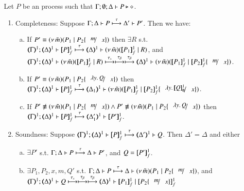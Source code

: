 \documentclass[runningheads]{llncs}
\begin{document}
{\begin{proposition}%
	\label{prop:op_corr_HOp_to_HO}
	Let $P$ be an \HOp process such that $\Gamma; \emptyset; \Delta \vdash P \triangleright \diamond$.
	\begin{enumerate}[1.]
		\item Completeness: 
			Suppose $\Gamma; \Delta \vdash P \stackrel{\tau}{\longmapsto} \Delta' \vdash P'$. Then we have:
%
			\begin{enumerate}[a)]
				\item
					If  $P' \scong \newsp{\tilde{m}}{P_1 \Par P_2\subst{m}{x}}$
					then $\exists R$ s.t. \\
					$\horel{\tmap{\Gamma}{1}}{\tmap{\Delta}{1}}{\pmapp{P}{1}{f}}{\hby{\tau}}{\mapt{\Delta}^{1}}{\newsp{\tilde{m}}{\pmapp{P_1}{1}{f} \Par R}}$,
					and\\ 
					$\horel{\tmap{\Gamma}{1}}{\tmap{\Delta}{1}}{\newsp{\tilde{m}}{\pmapp{P_1}{1}{f} \Par R}}{\hby{\stau} \hby{\btau} \hby{\btau}}
					{\mapt{\Delta}^{1}}{\newsp{\tilde{m}}{\pmapp{P_1}{1}{f} \Par \pmapp{P_2}{1}{f}\subst{m}{x}}}$.
			
				\item
					If  $P' \scong \newsp{\tilde{m}}{P_1 \Par P_2 \subst{\abs{y}Q}{x}}$
					then \\
					$\horel{\tmap{\Gamma}{1}}{\tmap{\Delta}{1}}{\pmapp{P}{1}{f}}{\hby{\tau}}
					{\tmap{\Delta_1}{1}}{\newsp{\tilde{m}}{\pmapp{P_1}{1}{f}\Par \pmapp{P_2}{1}{f}\subst{\abs{y}\pmapp{Q}{1}{\emptyset}}{x}}}$.
			
				\item
					If   $P' \not\scong \newsp{\tilde{m}}{P_1 \Par P_2 \subst{m}{x}} \land P' \not\scong \newsp{\tilde{m}}{P_1 \Par P_2\subst{\abs{y}Q}{x}}$
					then \\
					$\horel{\tmap{\Gamma}{1}}{\tmap{\Delta}{1}}{\pmapp{P}{1}{f}}{\hby{\tau}}{\tmap{\Delta'_1}{1}}{ \pmapp{P'}{1}{f}}$.
			\end{enumerate}
			
		\item Soundness:	Suppose $\horel{\tmap{\Gamma}{1}}{\tmap{\Delta}{1}}{\pmapp{P}{1}{f}}{\hby{\tau}}{\tmap{\Delta'}{1}}{Q}$.
			Then $\Delta' = \Delta$ and 
					either
%
					\begin{enumerate}[a)]
						\item	$\exists P'$ s.t. 
							$\Gamma; \Delta \vdash P \stackrel{\tau}{\longmapsto} \Delta \vdash P'$,
							and $Q = [\!\![P']\!\!]^{1}_f$.	

						\item
							$\exists P_1, P_2, x, m, Q'$ s.t. 
							$\horel{\Gamma}{\Delta}{P}{\hby{\tau}}{\Delta}{\newsp{\tilde{m}}{P_1 \Par P_2\subst{m}{x}} }$, and\\
							$\horel{\tmap{\Gamma}{1}}{\tmap{\Delta}{1}}{Q}{\hby{\stau} \hby{\btau} \hby{\btau}}{\tmap{\Delta}{1}}{\pmapp{P_1}{1}{f} \Par \pmapp{P_2\subst{m}{x}}{1}{f}}$ 


\end{enumerate}
\end{enumerate}
\end{proposition}}
\end{document}
